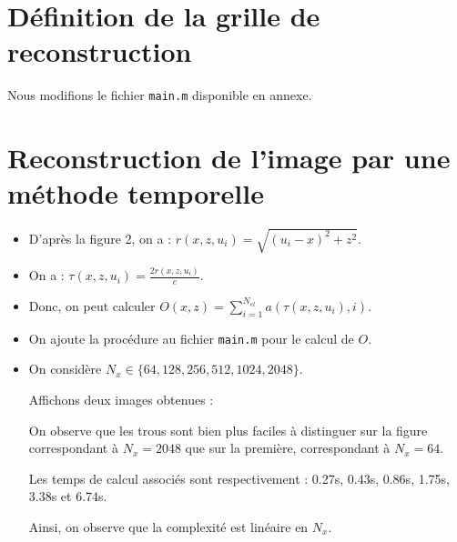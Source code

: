 \documentclass[12pt,a4paper,titlepage]{article}
\begin{document}
\section{Définition de la grille de reconstruction}

Nous modifions le fichier \texttt{main.m} disponible en annexe.

\section{Reconstruction de l'image par une méthode temporelle}

\begin{itemize}
    \item{D'après la figure 2, on a : $r(x,z,u_i) = \sqrt{(u_i - x)^2 + z^2}$.}
    \item{On a : $\tau(x, z, u_i) = \frac{2r(x,z,u_i)}{c}$.}
    \item{Donc, on peut calculer $O(x,z) = \sum_{i=1}^{N_{el}}a(\tau(x, z, u_i),i)$.}
    \item{On ajoute la procédure au fichier \texttt{main.m} pour le calcul de $O$.}
    \item{On considère $N_x \in \{64,128,256,512,1024,2048\}$.

            Affichons deux images obtenues :

            \begin{figure}[H]
                \hfill
                \caption{}
            \end{figure}

    On observe que les trous sont bien plus faciles à distinguer sur la
    figure correspondant à $N_x = 2048$ que sur la première, correspondant
    à $N_x = 64$.

    Les temps de calcul associés sont respectivement :
    0.27s, 0.43s, 0.86s, 1.75s, 3.38s et 6.74s.

    Ainsi, on observe que la complexité est linéaire en $N_x$.
        }
\end{itemize}
\end{document}
